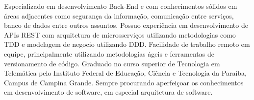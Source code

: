 \begin{cvletter}
  Especializado em desenvolvimento Back-End e com conhecimentos sólidos em áreas adjacentes como segurança da informação, comunicação entre serviços, banco de dados entre outros assuntos.
  Possuo experiência em desenvolvimento de APIs REST com arquitetura de microsserviços utilizando metodologias como TDD e modelagem de negocio utilizando DDD.
  Facilidade de trabalho remoto em equipe, principalmente utilizando metodologias ágeis e ferramentas de versionamento de código.
  Graduado no curso superior de Tecnologia em Telemática pelo Instituto Federal de Educação, Ciência e Tecnologia da Paraíba, Campus de Campina Grande.
  Sempre procurando aperfeiçoar os conhecimentos em desenvolvimento de software, em especial arquitetura de software.
\end{cvletter}